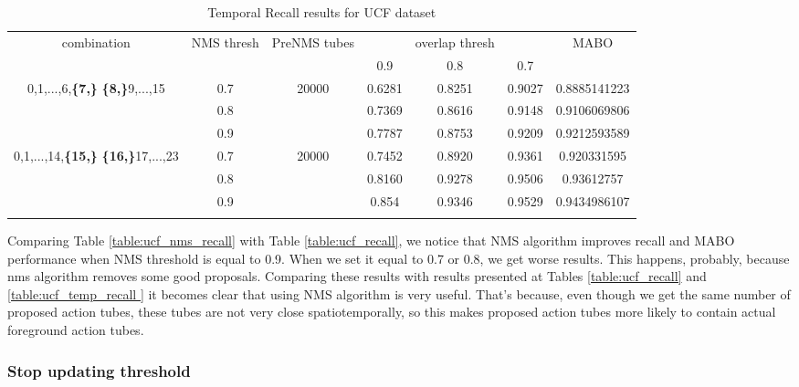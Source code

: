 \begin{center}
  \setlength{\tabcolsep}{2.2pt}
\begin{longtable}{||c | c | c | c c c| c|}

  \hline
  \multirow{2}{*}{combination} & \multirow{2}{2.5em}{NMS thresh} & \multirow{2}{3.5em}{PreNMS tubes} &  {} &overlap thresh & {} & \multirow{2}{*}{MABO} \\
  {} & {} & {} &  0.9 &  0.8 & 0.7 & {}\\         
  \hline
  \multirow{3}{7em}{0,1,...,6,\textbf{\{7,\}}
  \textbf{\{8,\}}9,...,15 }  & 0.7 &\multirow{3}{*}{20000}  & 0.6281 & 0.8251 & 0.9027 & 0.8885141223  \\
  \cline{2-2} \cline{4-7} 
  {} &  0.8   & {}   & 0.7369 & 0.8616 & 0.9148 & 0.9106069806 \\
  \cline{2-2} \cline{4-7} 
  {} &  0.9   & {}   &  0.7787 & 0.8753 & 0.9209 & 0.9212593589 \\
  \hline                                    
  \multirow{3}{7em}{0,1,...,14,\textbf{\{15,\}}
  \textbf{\{16,\}}17,...,23 }  & 0.7 & \multirow{3}{*}{20000}   & 0.7452 & 0.8920 & 0.9361 & 0.920331595 \\
  \cline{2-2} \cline{4-7} 
  {} &  0.8   & {}   & 0.8160 & 0.9278 & 0.9506 & 0.93612757 \\
  \cline{2-2} \cline{4-7} 
  {} &  0.9   & {}   & 0.854 & 0.9346 & 0.9529 & 0.9434986107 \\
  \hline                                    

  \caption{Temporal Recall results for UCF dataset}
  \label{table:ucf_nms_temp_recall}
\end{longtable} 
\end{center}

Comparing Table \ref{table:ucf_nms_recall} with Table \ref{table:ucf_recall},  we notice that NMS algorithm improves recall and MABO
performance when NMS threshold is equal to 0.9. When we set it equal to 0.7 or 0.8, we get worse results. This happens, probably, because
nms algorithm removes some good proposals. Comparing these results with results presented at Tables \ref{table:ucf_recall} and \ref{table:ucf_temp_recall } it becomes clear that using NMS algorithm is very useful. That's because, even though we get the same number of proposed action tubes,
these tubes are not very close spatiotemporally, so this makes proposed action tubes more likely to contain actual foreground action tubes.

\subsubsection{Stop updating threshold}

